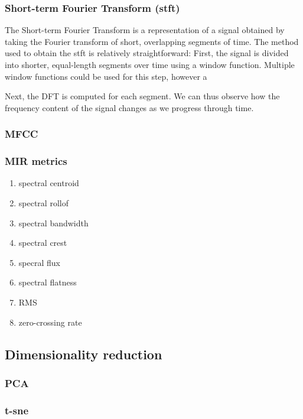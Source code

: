 \documentclass[11pt]{article}
\begin{document}
\subsubsection{Short-term Fourier Transform (stft)}
\label{sec:orgf918c4f}
The Short-term Fourier Transform is a representation of a signal obtained by taking the Fourier transform of short, overlapping segments of time. The method used to obtain the stft is relatively straightforward:
First, the signal is divided into shorter, equal-length segments over time using a window function. Multiple window functions could be used for this step, however a

Next, the DFT is computed for each segment. We can thus observe how the frequency content of the signal changes as we progress through time.
\subsubsection{MFCC}
\label{sec:org558512b}
\subsubsection{MIR metrics}
\label{sec:org8cba016}
\begin{enumerate}
\item spectral centroid
\label{sec:org1e6d126}
\item spectral rollof
\label{sec:org870cdb1}
\item spectral bandwidth
\label{sec:orgbc56672}
\item spectral crest
\label{sec:orga5b61e6}
\item specral flux
\label{sec:org61d322d}
\item spectral flatness
\label{sec:orgb19b6b8}
\item RMS
\label{sec:org66d7ae7}
\item zero-crossing rate
\label{sec:org1dfc935}
\end{enumerate}
\subsection{Dimensionality reduction}
\label{sec:org1a42de1}
\subsubsection{PCA}
\label{sec:orged7ef64}
\subsubsection{t-sne}
\label{sec:org0805fca}
\end{document}
